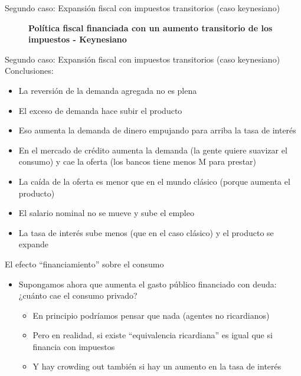 \documentclass{beamer}
\begin{document}
\begin{frame}{Segundo caso: Expansión fiscal con impuestos transitorios (caso keynesiano)}
\begin{figure}[H]
\begin{center}
\end{center}
\vspace{0.7cm}
\caption{\textbf{Política fiscal financiada con un aumento transitorio de los impuestos - Keynesiano}}
\label{fig:C36.4}
\end{figure}

\end{frame}

\begin{frame}{Segundo caso: Expansión fiscal con impuestos transitorios (caso keynesiano)}
   Conclusiones:
   \begin{itemize}
       \item La reversión de la demanda agregada no es plena
       \item El exceso de demanda hace subir el producto 
       \item Eso aumenta la demanda de dinero empujando para arriba la tasa de interés 
       \item En el mercado de crédito aumenta la demanda (la gente quiere suavizar el consumo) y cae la oferta (los bancos tiene menos M para prestar)
       \item La caída de la oferta es menor que en el mundo clásico (porque aumenta el producto)
       \item El salario nominal no se mueve y sube el empleo
        \item La tasa de interés sube menos (que en el caso clásico) y el producto se expande 
   \end{itemize}
    
\end{frame}

\begin{frame}{El efecto “financiamiento” sobre el consumo}
    \begin{itemize}
        \item Supongamos ahora que aumenta el gasto público financiado con deuda: ¿cuánto cae el consumo privado?
        \begin{itemize}
            \item En principio podríamos pensar que nada (agentes no ricardianos)
            \item Pero en realidad, si existe “equivalencia ricardiana” es igual que si financia con impuestos
            \item Y hay crowding out también si hay un aumento en la tasa de interés
        \end{itemize}
    \end{itemize}
\end{frame}
\end{document}
